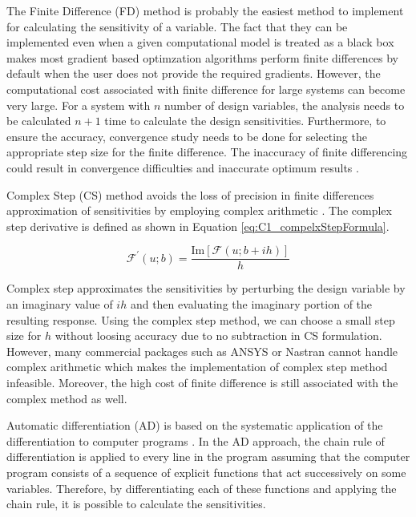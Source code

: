 The Finite Difference (FD) method is probably the easiest method to implement for calculating the sensitivity of a variable. The fact that they can be implemented even when a given computational model is treated as a black box makes most gradient based optimzation algorithms perform finite differences by default when the user does not provide the required gradients. However, the computational cost associated with finite difference for large systems can become very large. For a system with $n$ number of design variables, the analysis needs to be calculated $n+1$ time to calculate the design sensitivities. Furthermore, to ensure the accuracy, convergence study needs to be done for selecting the appropriate step size for the finite difference. The inaccuracy of finite differencing could result in convergence difficulties and inaccurate optimum results \cite{sobieszczanski1997multidisciplinary}.

Complex Step (CS) method avoids the loss of precision in finite differences approximation of sensitivities by employing complex arithmetic \cite{martins2003complex}. The complex step derivative is defined as shown in Equation \eqref{eq:C1_compelxStepFormula}.

\begin{equation}\label{eq:C1_compelxStepFormula}
	\mathcal{F}^\prime\left(u; b\right) = \frac{\text{Im}\left[ \mathcal{F}\left(u; b + ih\right) \right]}{h}
\end{equation}

Complex step approximates the sensitivities by perturbing the design variable by an imaginary value of $ih$ and then evaluating
the imaginary portion of the resulting response. Using the complex step method, we can choose a
small step size for $h$ without loosing accuracy due to no subtraction in CS formulation. However, many commercial packages such as ANSYS or Nastran cannot handle complex arithmetic which makes the implementation of complex step method infeasible. Moreover, the high cost of finite difference is still associated with the complex method as well.

Automatic differentiation (AD) is based on the systematic application of the differentiation to computer programs \cite{naumann2012art}. In the AD approach, the chain rule of differentiation is applied to every line in the program assuming that the computer program consists of a sequence of explicit functions that act successively on some variables. Therefore, by differentiating each of these functions and applying the chain rule, it is possible to calculate the sensitivities. 


